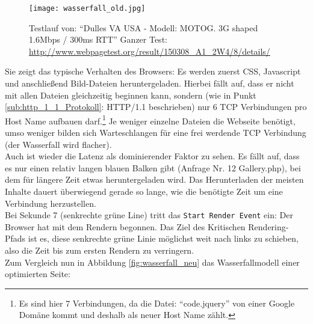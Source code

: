 		\begin{figure}[htbp]
			\begin{center}
				\texttt{[image: wasserfall\_old.jpg]}
				\caption{Testlauf von: "`Dulles VA USA - Modell: MOTOG. 3G shaped 1.6Mbps / 300ms RTT"' Ganzer Test: \url{http://www.webpagetest.org/result/150308_A1_2W4/8/details/}}
				\label{fig:wasserfall_old}
			\end{center}
		\end{figure}
		
	  Sie zeigt das typische Verhalten des Browsers: Es werden zuerst CSS, Javascript und anschließend Bild-Dateien heruntergeladen. Hierbei fällt auf, dass er nicht mit allen Dateien gleichzeitig beginnen kann, sondern (wie in Punkt \ref{sub:http_1_1_Protokoll}: HTTP/1.1 beschrieben) nur 6 TCP Verbindungen pro Host Name aufbauen darf.\footnote{Es sind hier 7 Verbindungen, da die Datei: "`code.jquery"' von einer Google Domäne kommt und deshalb als neuer Host Name zählt.} Je weniger einzelne Dateien die Webseite benötigt, umso weniger bilden sich Warteschlangen für eine frei werdende TCP Verbindung (der Wasserfall wird flacher).\\
	  Auch ist wieder die Latenz als dominierender Faktor zu sehen. Es fällt auf, dass es nur einen relativ langen blauen Balken gibt (Anfrage Nr. 12 Gallery.php), bei dem für längere Zeit etwas heruntergeladen wird. Das Herunterladen der meisten Inhalte dauert überwiegend gerade so lange, wie die benötigte Zeit um eine Verbindung herzustellen.\\
	  Bei Sekunde 7 (senkrechte grüne Line) tritt das \texttt{Start Render Event} ein: Der Browser hat mit dem Rendern begonnen. Das Ziel des Kritischen Rendering-Pfads ist es, diese senkrechte grüne Linie möglichst weit nach links zu schieben, also die Zeit bis zum ersten Rendern zu verringern.\\

	  Zum Vergleich nun in Abbildung \ref{fig:wasserfall_neu} das Wasserfallmodell einer optimierten Seite:

